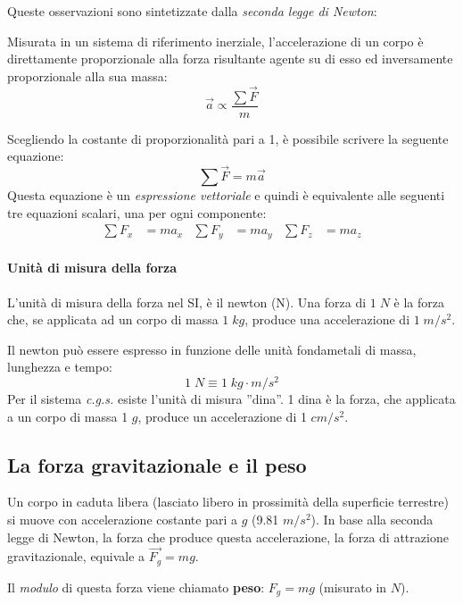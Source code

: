 \documentclass[12pt,oneside]{book}
\begin{document}
Queste osservazioni sono sintetizzate dalla \emph{seconda legge di Newton}:
\begin{displayquote}
    \centering
    Misurata in un sistema di riferimento inerziale, l’accelerazione di un corpo è direttamente
    proporzionale alla forza risultante agente su di esso ed inversamente proporzionale alla sua massa:
    \begin{equation*}
        \vec{a} \propto \frac{\sum\vec{F}}{m}
    \end{equation*}
\end{displayquote}
Scegliendo la costante di proporzionalità pari a 1, è possibile scrivere la seguente equazione:
\begin{equation*}
    \sum\vec{F} = m\vec{a}
\end{equation*}
Questa equazione è un \emph{espressione vettoriale} e quindi è equivalente alle seguenti tre equazioni scalari, una per ogni componente:
\begin{align*}
    \sum F_x & = ma_x & \sum F_y & = ma_y & \sum F_z & = ma_z
\end{align*}

\paragraph{Unità di misura della forza}
L’unità di misura della forza nel SI, è il newton (N).
Una forza di $1 \; N$ è la forza che, se applicata ad un corpo di massa $1 \; kg$, produce una accelerazione di $1 \; m/s^2$.

Il newton può essere espresso in funzione delle unità fondametali di massa, lunghezza e tempo:
\begin{equation*}
    1 \; N \equiv 1 \; kg \cdot m/s^2
\end{equation*}
Per il sistema \emph{c.g.s.} esiste l'unità di misura ''dina''. 1 dina è la forza, che applicata a un corpo di massa 1 $g$, produce un accelerazione di 1 $cm/s^2$.

\subsection{La forza gravitazionale e il peso}
Un corpo in caduta libera (lasciato libero in prossimità della superficie terrestre) si muove con accelerazione costante pari a $g$ (9.81 $m/s^2$).
In base alla seconda legge di Newton, la forza che produce questa accelerazione, la forza di attrazione gravitazionale, equivale a $\vec{F_g} = mg$.

Il \emph{modulo} di questa forza viene chiamato \textbf{peso}: $F_g = mg$ (misurato in $N$).
\end{document}

